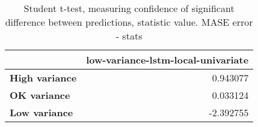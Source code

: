 \begin{table}[h]
\centering
\caption{Student t-test, measuring confidence of significant difference between predictions, statistic value. MASE error - stats}
\label{table:ttest-stats-variance-experiments-MASE}
\begin{tabular}{lr}
\toprule
{} &  low-variance-lstm-local-univariate \\
\midrule
\textbf{High variance} &                            0.943077 \\
\textbf{OK variance  } &                            0.033124 \\
\textbf{Low variance } &                           -2.392755 \\
\bottomrule
\end{tabular}
\end{table}
